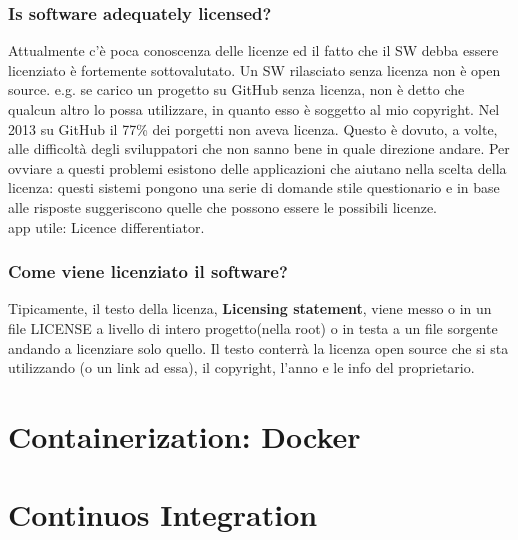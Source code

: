 \documentclass[10pt,a4paper]{book}
\begin{document}
\subsection{Is software adequately licensed?}
Attualmente c'è poca conoscenza delle licenze ed il fatto che il SW debba essere licenziato è fortemente sottovalutato.
Un SW rilasciato senza licenza non è open source. e.g. se carico un progetto su GitHub senza licenza, non è detto che qualcun altro lo possa utilizzare, in quanto esso è soggetto al mio copyright.
Nel 2013 su GitHub il 77\% dei porgetti non aveva licenza. Questo è dovuto, a volte, alle difficoltà degli sviluppatori che non sanno bene in quale direzione andare.
Per ovviare a questi problemi esistono delle applicazioni che aiutano nella scelta della licenza: questi sistemi pongono una serie di domande stile questionario e in base alle risposte suggeriscono quelle che possono essere le possibili licenze. \\
app utile: Licence differentiator.

\subsection{Come viene licenziato il software?}
Tipicamente, il testo della licenza, \textbf{Licensing statement}, viene messo o in un file LICENSE a livello di intero progetto(nella root) o in testa a un file sorgente andando a licenziare solo quello.
Il testo conterrà la licenza open source che si sta utilizzando (o un link ad essa), il copyright, l'anno e le info del proprietario.

\chapter{Containerization: Docker}






\chapter{Continuos Integration}
\end{document}

